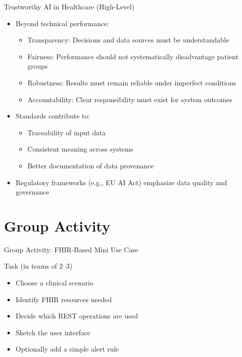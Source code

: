 \documentclass[aspectratio=1610]{beamer}
\begin{document}
	\begin{frame}{Trustworthy AI in Healthcare (High-Level)}
		\begin{itemize}
			\item Beyond technical performance:
			\begin{itemize}
				\item Transparency: Decisions and data sources must be understandable
				\item Fairness: Performance should not systematically disadvantage patient groups
				\item Robustness: Results must remain reliable under imperfect conditions
				\item Accountability: Clear responsibility must exist for system outcomes
			\end{itemize}
			\item Standards contribute to:
			\begin{itemize}
				\item Traceability of input data
				\item Consistent meaning across systems
				\item Better documentation of data provenance
			\end{itemize}
			\item Regulatory frameworks (e.g., EU AI Act) emphasize data quality and governance
		\end{itemize}
	\end{frame}
	
	\section{Group Activity}
	
	\begin{frame}{Group Activity: FHIR-Based Mini Use Case}
		\begin{block}{Task (in teams of 2--3)}
			\begin{itemize}
				\item Choose a clinical scenario
				\item Identify FHIR resources needed
				\item Decide which REST operations are used
				\item Sketch the user interface
				\item Optionally add a simple alert rule
			\end{itemize}
		\end{block}
	\end{frame}
	
\end{document}
